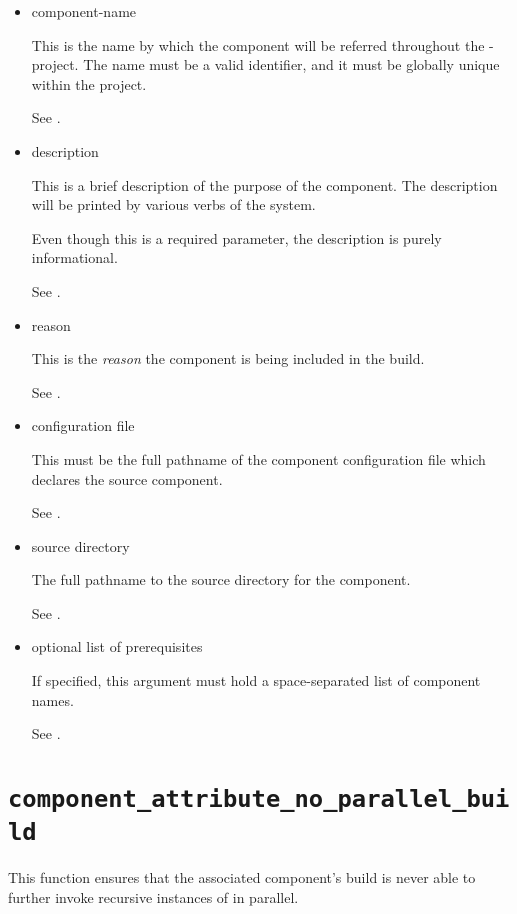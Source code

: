 \begin{itemize}
\item{component-name}

  This is the name by which the component will be referred throughout
  the \lmsbw-project.  The name must be a valid \make identifier, and
  it must be globally unique within the project.

  See .

\item{description}

  This is a brief description of the purpose of the component.  The
  description will be printed by various verbs of the \lmsbw system.

  Even though this is a required parameter, the description is purely
  informational.

  See .

\item{reason}

  This is the \emph{reason} the component is being included in the
  build.

  See .

\item{configuration file}

  This must be the full pathname of the component configuration file
  which declares the source component.

  See .

\item{source directory}

  The full pathname to the source directory for the component.

  See .

\item{optional list of prerequisites}

  If specified, this argument must hold a space-separated list of
  component names.

  See .

\end{itemize}

\section{\texttt{component\_attribute\_no\_parallel\_build}}\label{api:component-attribute-no-parallel-build}

This function ensures that the associated component's build is never
able to further invoke recursive instances of \make in parallel.

